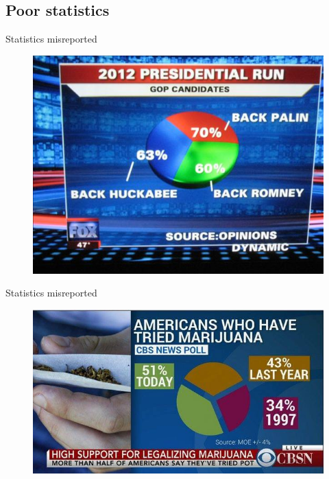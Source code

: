 \documentclass[12pt,english,pdf,dvipsnames,handout]{beamer}
\begin{document}
\subsection{Poor statistics}
\begin{frame}{Statistics misreported}

\begin{figure}
	\centering
	\includegraphics[scale=0.45]{../04-graphs/16_Fox_piechart}
\end{figure}

\end{frame}


\begin{frame}{Statistics misreported}

\begin{figure}
	\centering
	\includegraphics[scale=0.45]{../04-graphs/17_CBS_piechart}
\end{figure}

\end{frame}
\end{document}
